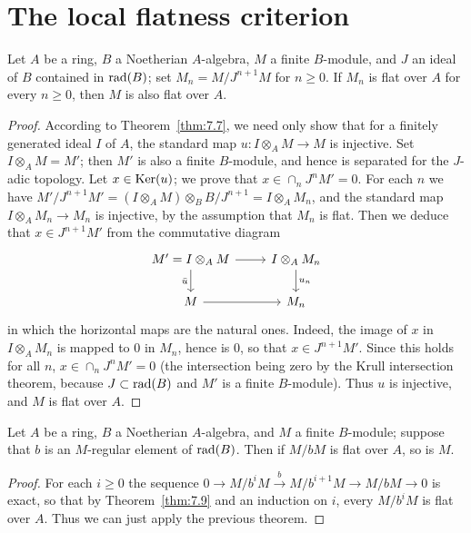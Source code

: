 \section{The local flatness criterion}\label{sec:22}

\begin{theorem}\label{thm:22.1}
Let $A$ be a ring, $B$ a Noetherian $A$-algebra, $M$ a finite $B$-module, and
$J$ an ideal of $B$ contained in $\operatorname{rad}(B)$; set $M_n = M/J^{n+1}M$ for $n \ge 0$.
If $M_n$ is flat over $A$ for every $n \ge 0$, then $M$ is also flat over $A$.
\end{theorem}

\begin{proof}
According to Theorem~\ref{thm:7.7}, we need only show that for a finitely
generated ideal $I$ of $A$, the standard map $u\colon I \otimes_A M \to M$ is
injective. Set $I \otimes_A M = M'$; then $M'$ is also a finite $B$-module, and
hence is separated for the $J$-adic topology. Let $x \in \operatorname{Ker}(u)$; we prove that
$x \in \cap_n J^nM' = 0$. For each $n$ we have $M'/J^{n+1}M' = (I \otimes_A M)
\otimes_B B/J^{n+1} = I \otimes_A M_n$, and the standard map $I \otimes_A M_n \to
M_n$ is injective, by the assumption that $M_n$ is flat. Then we deduce that
$x \in J^{n+1}M'$ from the commutative diagram
\[
\begin{tikzcd}
M' = I \otimes_A M \arrow[r] \arrow[d, "\bar{u}"'] & I \otimes_A M_n \arrow[d, "u_n"] \\
M \arrow[r] & M_n
\end{tikzcd}
\]
in which the horizontal maps are the natural ones. Indeed, the image of $x$ in
$I \otimes_A M_n$ is mapped to $0$ in $M_n$, hence is $0$, so that
$x \in J^{n+1}M'$. Since this holds for all $n$, $x \in \cap_n J^nM' = 0$ (the
intersection being zero by the Krull intersection theorem, because $J \subset
\operatorname{rad}(B)$ and $M'$ is a finite $B$-module). Thus $u$ is injective, and $M$ is
flat over $A$.
\end{proof}

\begin{theorem}\label{thm:22.2}
Let $A$ be a ring, $B$ a Noetherian $A$-algebra, and $M$ a finite $B$-module;
suppose that $b$ is an $M$-regular element of $\operatorname{rad}(B)$. Then if $M/bM$ is flat
over $A$, so is $M$.
\end{theorem}

\begin{proof}
For each $i \ge 0$ the sequence $0 \to M/b^iM \xrightarrow{b} M/b^{i+1}M \to
M/bM \to 0$ is exact, so that by Theorem~\ref{thm:7.9} and an induction on $i$,
every $M/b^iM$ is flat over $A$. Thus we can just apply the previous theorem.
\end{proof}

